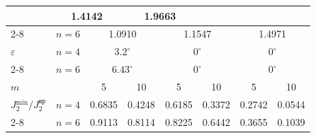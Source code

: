 \begin{center}
\begin{tabular}{|l|l|c|c|c|c|c|c|}
& \multicolumn{2}{|c|}{1.4142}


& \multicolumn{2}{|c|}{1.9663} \\


\cline{2-8}


& $n=6$


& \multicolumn{2}{|c|}{1.0910}


& \multicolumn{2}{|c|}{1.1547}


& \multicolumn{2}{|c|}{1.4971} \\





\hline


$\varepsilon$ & $n=4$


& \multicolumn{2}{|c|}{$3.2^{\circ}$}


& \multicolumn{2}{|c|}{$0^{\circ}$}


& \multicolumn{2}{|c|}{$0^{\circ}$} \\


\cline{2-8}


& $n=6$


& \multicolumn{2}{|c|}{$6.43^{\circ}$}


& \multicolumn{2}{|c|}{$0^{\circ}$}


& \multicolumn{2}{|c|}{$0^{\circ}$} \\





\hline


\multicolumn{2}{|l|}{$m$} & 5 & 10 & 5 & 10 & 5 & 10 \\





\hline


$\overset{\phantom{.}}{J}{}^{\min}_{2} / J^{\text{вр}}_2$ & $n=4$


& 0.6835 & 0.4248 & 0.6185 & 0.3372 & 0.2742 & 0.0544 \\





\cline{2-8}


& $n=6$ & 0.9113 & 0.8114 & 0.8225 & 0.6442 & 0.3655 & 0.1039 \\


\hline


\end{tabular}


\end{center}


\vspace{0.2cm}








